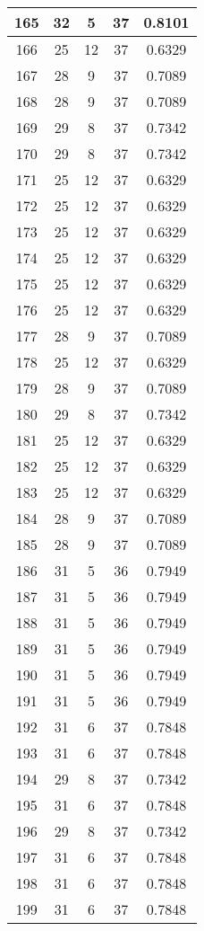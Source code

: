 \documentclass[letterpaper, 12pt]{article}
\begin{document}
\begin{longtable}{|c|c|c|c|c|}
\hline
165 & 32 & 5 & 37 & 0.8101 \\
\hline
166 & 25 & 12 & 37 & 0.6329 \\
\hline
167 & 28 & 9 & 37 & 0.7089 \\
\hline
168 & 28 & 9 & 37 & 0.7089 \\
\hline
169 & 29 & 8 & 37 & 0.7342 \\
\hline
170 & 29 & 8 & 37 & 0.7342 \\
\hline
171 & 25 & 12 & 37 & 0.6329 \\
\hline
172 & 25 & 12 & 37 & 0.6329 \\
\hline
173 & 25 & 12 & 37 & 0.6329 \\
\hline
174 & 25 & 12 & 37 & 0.6329 \\
\hline
175 & 25 & 12 & 37 & 0.6329 \\
\hline
176 & 25 & 12 & 37 & 0.6329 \\
\hline
177 & 28 & 9 & 37 & 0.7089 \\
\hline
178 & 25 & 12 & 37 & 0.6329 \\
\hline
179 & 28 & 9 & 37 & 0.7089 \\
\hline
180 & 29 & 8 & 37 & 0.7342 \\
\hline
181 & 25 & 12 & 37 & 0.6329 \\
\hline
182 & 25 & 12 & 37 & 0.6329 \\
\hline
183 & 25 & 12 & 37 & 0.6329 \\
\hline
184 & 28 & 9 & 37 & 0.7089 \\
\hline
185 & 28 & 9 & 37 & 0.7089 \\
\hline
186 & 31 & 5 & 36 & 0.7949 \\
\hline
187 & 31 & 5 & 36 & 0.7949 \\
\hline
188 & 31 & 5 & 36 & 0.7949 \\
\hline
189 & 31 & 5 & 36 & 0.7949 \\
\hline
190 & 31 & 5 & 36 & 0.7949 \\
\hline
191 & 31 & 5 & 36 & 0.7949 \\
\hline
192 & 31 & 6 & 37 & 0.7848 \\
\hline
193 & 31 & 6 & 37 & 0.7848 \\
\hline
194 & 29 & 8 & 37 & 0.7342 \\
\hline
195 & 31 & 6 & 37 & 0.7848 \\
\hline
196 & 29 & 8 & 37 & 0.7342 \\
\hline
197 & 31 & 6 & 37 & 0.7848 \\
\hline
198 & 31 & 6 & 37 & 0.7848 \\
\hline
199 & 31 & 6 & 37 & 0.7848 \\
\hline
\end{longtable}
\end{document}
